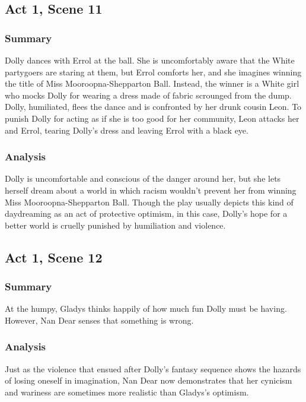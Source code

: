 \documentclass[a4paper]{article}
\begin{document}
\subsection{Act 1, Scene 11}
\subsubsection{Summary}
Dolly dances with Errol at the ball. She is uncomfortably aware
that the White partygoers are staring at them, but Errol
comforts her, and she imagines winning the title of Miss
Mooroopna-Shepparton Ball. Instead, the winner is a White girl
who mocks Dolly for wearing a dress made of fabric scrounged
from the dump. Dolly, humiliated, flees the dance and is
confronted by her drunk cousin Leon. To punish Dolly for
acting as if she is too good for her community, Leon attacks her
and Errol, tearing Dolly’s dress and leaving Errol with a black
eye.\\

\subsubsection{Analysis}
Dolly is uncomfortable and conscious of the danger around her, but
she lets herself dream about a world in which racism wouldn’t
prevent her from winning Miss Mooroopna-Shepparton Ball.
Though the play usually depicts this kind of daydreaming as an act
of protective optimism, in this case, Dolly’s hope for a better world is
cruelly punished by humiliation and violence.\\

\subsection{Act 1, Scene 12}
\subsubsection{Summary}
At the humpy, Gladys thinks happily of how much fun Dolly
must be having. However, Nan Dear senses that something is
wrong.\\

\subsubsection{Analysis}
Just as the violence that ensued after Dolly’s fantasy sequence
shows the hazards of losing oneself in imagination, Nan Dear now
demonstrates that her cynicism and wariness are sometimes more
realistic than Gladys’s optimism.\\
\end{document}
